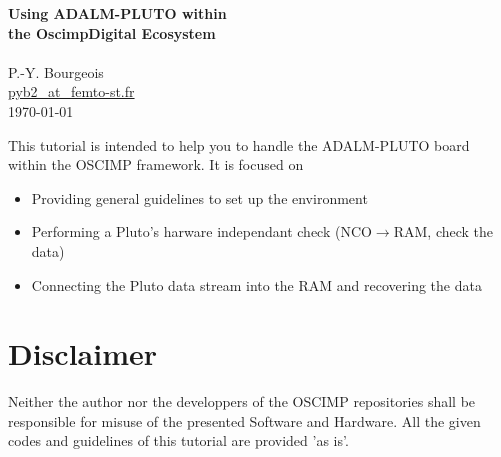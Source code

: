 \documentclass[12pt,oneside]{article}
\begin{document}
\begin{center}
{\bf \Large Using ADALM-PLUTO within \\ the OscimpDigital Ecosystem} \\ \ \\
P.-Y. Bourgeois \\ \href{mailto:pyb2@femto-st.fr}{pyb2\_at\_femto-st.fr}\ \\ \today
\end{center}


This tutorial is intended to help you to handle the ADALM-PLUTO board within the
OSCIMP framework.
It is focused on

\begin{itemize}
	\item Providing general guidelines to set up the environment
	\item Performing a Pluto's harware independant check (NCO$\to$RAM, check the data)
	\item Connecting the Pluto data stream into the RAM and recovering the data
\end{itemize}

\begin{figure}[h!]
\end{figure}


\section*{Disclaimer}
Neither the author nor the developpers of the OSCIMP repositories shall be
responsible for misuse of the presented Software and Hardware.
All the given codes and guidelines of this tutorial are provided 'as is'.
\end{document}

